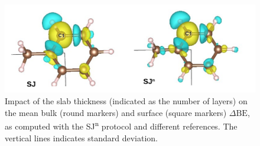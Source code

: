 \documentclass[journal=jpccck,manuscript=article]{achemso}
\def\dbe{\ensuremath{\Delta\text{BE}}}
\begin{document}
\begin{figure}[!h]
\centering
\includegraphics[width=\linewidth]{FigureS4}
\caption{Impact of the slab thickness (indicated as the number of layers) on the mean bulk (round markers)  and surface (square markers) \dbe{}, as computed with the SJ\textsuperscript{n} protocol and different references. The vertical lines indicates standard deviation.}
\label{fig:slabsthicknessSJn}
\end{figure}
\end{document}
